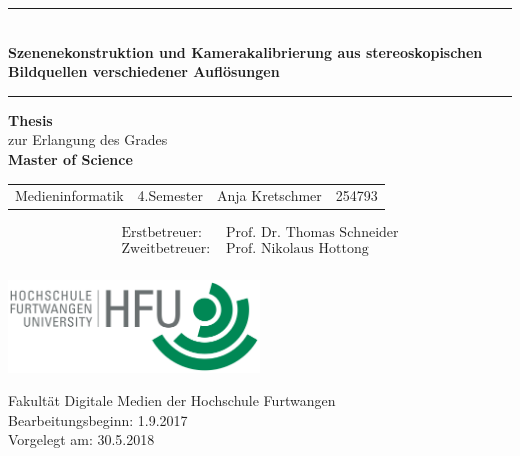 \begin{titlepage}
\thispagestyle{empty}

\begin{center}
	\enlargethispage{3\baselineskip}
	\hrule
	
	\begin{center} \LARGE \textbf{\\Szenenekonstruktion und Kamerakalibrierung aus stereoskopischen Bildquellen verschiedener Auflösungen}
	\end{center}
	
	\vspace{0.5cm}
	
	\hrule
	
	\vspace{2.5cm}
	
	{\Large \textbf{Thesis}\\ zur Erlangung des Grades\\[2ex]
	\textbf{Master of Science}}
	
	\vspace{3cm}
	
	\begin{tabular}{l l l l}
		Medieninformatik &4.Semester &Anja Kretschmer &254793 \vspace{0.2cm} \\	
	\end{tabular}
	
	\vspace{1cm}
	
	\begin{align*}
	\text{Erstbetreuer: }  &\text{Prof. Dr. Thomas Schneider}\\
	\text{Zweitbetreuer: }  &\text{Prof. Nikolaus Hottong}\\
	\end{align*}	
	
	\vspace{1.0cm}
	
	
	\vspace{1.5cm}
	\includegraphics[width=0.5\textwidth]{./images/hfu_logo.png}

	Fakultät Digitale Medien der Hochschule Furtwangen\\[1ex]
	Bearbeitungsbeginn: 1.9.2017\\
	Vorgelegt am: 30.5.2018 

\end{center}

\end{titlepage}